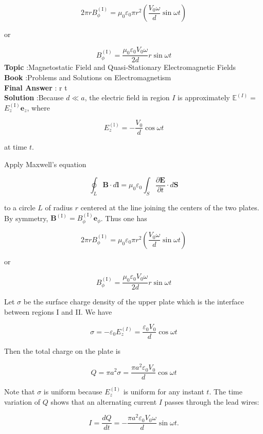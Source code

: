 \documentclass[10pt]{article}
\begin{document}
$$
2 \pi r B_{\phi}^{(\mathrm{I})}=\mu_{0} \varepsilon_{0} \pi r^{2}\left(\frac{V_{0} \omega}{d} \sin \omega t\right)
$$

or

$$
B_{\phi}^{(\mathrm{I})}=\frac{\mu_{0} \varepsilon_{0} V_{0} \omega}{2 d} r \sin \omega t
$$
\textbf{Topic} :Magnetostatic Field and Quasi-Stationary Electromagnetic Fields\\
\textbf{Book} :Problems and Solutions on Electromagnetism\\
\textbf{Final Answer} : r \sin \omega t\\


\textbf{Solution} :Because $d \ll a$, the electric field in region $I$ is approximately $\mathbb{E}^{(I)}=$ $E_{z}^{(\mathrm{I})} \mathbf{e}_{z}$, where

$$
E_{z}^{(\mathrm{l})}=-\frac{V_{0}}{d} \cos \omega t
$$

at time $t$.

Apply Maxwell's equation

$$
\oint_{L} \mathbf{B} \cdot d \mathbf{l}=\mu_{0} \varepsilon_{0} \int_{S} \frac{\partial \mathbf{E}}{\partial t} \cdot d \mathbf{S}
$$

to a circle $L$ of radius $r$ centered at the line joining the centers of the two plates. By symmetry, $\mathbf{B}^{(\mathrm{I})}=B_{\phi}^{(\mathrm{I})} \mathbf{e}_{\phi}$. Thus one has

$$
2 \pi r B_{\phi}^{(\mathrm{I})}=\mu_{0} \varepsilon_{0} \pi r^{2}\left(\frac{V_{0} \omega}{d} \sin \omega t\right)
$$

or

$$
B_{\phi}^{(\mathrm{I})}=\frac{\mu_{0} \varepsilon_{0} V_{0} \omega}{2 d} r \sin \omega t
$$

 Let $\sigma$ be the surface charge density of the upper plate which is the interface between regions I and II. We have

$$
\sigma=-\varepsilon_{0} E_{z}^{(I)}=\frac{\varepsilon_{0} V_{0}}{d} \cos \omega t
$$

Then the total charge on the plate is

$$
Q=\pi a^{2} \sigma=\frac{\pi a^{2} \varepsilon_{0} V_{0}}{d} \cos \omega t
$$

Note that $\sigma$ is uniform because $E_{z}^{(\mathrm{I})}$ is uniform for any instant $t$. The time variation of $Q$ shows that an alternating current $I$ passes through the lead wires:

$$
I=\frac{d Q}{d t}=-\frac{\pi a^{2} \varepsilon_{0} V_{0} \omega}{d} \sin \omega t .
$$
\end{document}
